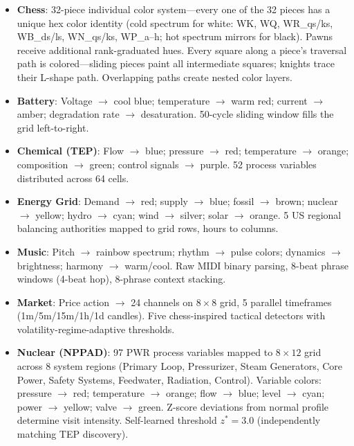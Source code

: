 \documentclass[12pt,a4paper]{article}
\begin{document}
\begin{itemize}
  \item \textbf{Chess}: 32-piece individual color system---every one of the 32 pieces has a
  unique hex color identity (cold spectrum for white: WK, WQ, WR\_qs/ks, WB\_ds/ls, WN\_qs/ks,
  WP\_a--h; hot spectrum mirrors for black). Pawns receive additional rank-graduated hues.
  Every square along a piece's traversal path is colored---sliding pieces paint all intermediate
  squares; knights trace their L-shape path. Overlapping paths create nested color layers.

  \item \textbf{Battery}: Voltage $\rightarrow$ cool blue; temperature $\rightarrow$ warm red;
  current $\rightarrow$ amber; degradation rate $\rightarrow$ desaturation. 50-cycle sliding
  window fills the grid left-to-right.

  \item \textbf{Chemical (TEP)}: Flow $\rightarrow$ blue; pressure $\rightarrow$ red; temperature
  $\rightarrow$ orange; composition $\rightarrow$ green; control signals $\rightarrow$ purple.
  52 process variables distributed across 64 cells.

  \item \textbf{Energy Grid}: Demand $\rightarrow$ red; supply $\rightarrow$ blue; fossil
  $\rightarrow$ brown; nuclear $\rightarrow$ yellow; hydro $\rightarrow$ cyan; wind $\rightarrow$
  silver; solar $\rightarrow$ orange. 5 US regional balancing authorities mapped to grid rows,
  hours to columns.

  \item \textbf{Music}: Pitch $\rightarrow$ rainbow spectrum; rhythm $\rightarrow$ pulse colors;
  dynamics $\rightarrow$ brightness; harmony $\rightarrow$ warm/cool. Raw MIDI binary parsing,
  8-beat phrase windows (4-beat hop), 8-phrase context stacking.

  \item \textbf{Market}: Price action $\rightarrow$ 24 channels on $8{\times}8$ grid, 5 parallel
  timeframes (1m/5m/15m/1h/1d candles). Five chess-inspired tactical detectors with
  volatility-regime-adaptive thresholds.

  \item \textbf{Nuclear (NPPAD)}: 97 PWR process variables mapped to $8{\times}12$ grid across 8
  system regions (Primary Loop, Pressurizer, Steam Generators, Core Power, Safety Systems,
  Feedwater, Radiation, Control). Variable colors: pressure $\rightarrow$ red; temperature
  $\rightarrow$ orange; flow $\rightarrow$ blue; level $\rightarrow$ cyan; power $\rightarrow$
  yellow; valve $\rightarrow$ green. Z-score deviations from normal profile determine visit
  intensity. Self-learned threshold $z^*{=}3.0$ (independently matching TEP discovery).
\end{itemize}
\end{document}
